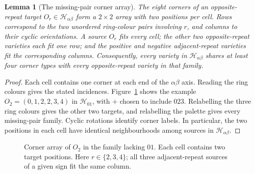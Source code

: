 \documentclass[11pt]{article}
\newtheorem{lemma}[theorem]{Lemma}
\theoremstyle{remark}
\begin{document}
\begin{lemma}[The missing-pair corner array]\label{lem:fixed-missing-pair}
The eight corners of an opposite-repeat target $O_r\in\mathcal H_{\alpha\beta}$
form a $2\times2$ array with two positions per cell. Rows correspond to
the two unordered ring-colour pairs involving $r$, and columns to their
cyclic orientations. A source $O_r$ fits every cell; the other two
opposite-repeat varieties each fit one row; and the positive and negative
adjacent-repeat varieties fit the corresponding columns.
Consequently, every variety in $\mathcal H_{\alpha\beta}$ shares at least four
corner types with every opposite-repeat variety in that family.
\end{lemma}
\begin{proof}
Each cell contains one corner at each end of the $\alpha\beta$ axis.
Reading the ring colours gives the stated incidences. Figure~\ref{fig:ring-array}
shows the example $O_2=(0,1,2,2,3,4)$ in $\mathcal H_{01}$, with $+$
chosen to include $023$. Relabelling the three ring colours gives the
other two targets, and relabelling the palette gives every missing-pair
family. Cyclic rotations identify corner labels. In particular, the
two positions in each cell have identical neighbourhoods among sources
in $\mathcal H_{\alpha\beta}$.
\end{proof}

\begin{figure}[ht]
\centering
{}
\caption{Corner array of $O_2$ in the family lacking $01$.
Each cell contains two target positions. Here $r\in\{2,3,4\}$;
all three adjacent-repeat sources of a given sign fit the same column.}
\label{fig:ring-array}
\end{figure}
\end{document}
